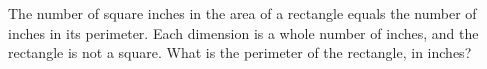 The number of square inches in the area of a rectangle equals the number of inches in its perimeter. Each dimension is a whole number of inches, and the rectangle is not a square. What is the perimeter of the rectangle, in inches?
